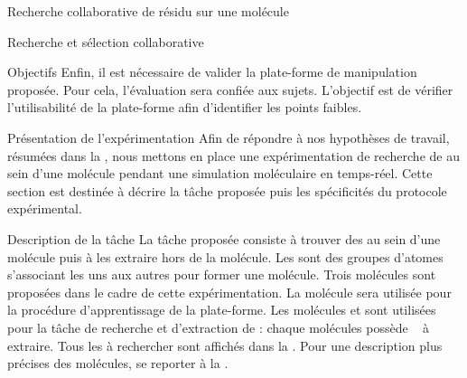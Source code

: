 \documentclass[myfrancais]{mythesis}
\begin{document}
\begin{mychapter}{Recherche collaborative de résidu sur une molécule}
\begin{mysection}{Recherche et sélection collaborative}
\begin{mysubsection}{Objectifs}
				Enfin, il est nécessaire de valider la plate-forme de manipulation proposée.
				Pour cela, l'évaluation sera confiée aux sujets.
				L'objectif est de vérifier l'utilisabilité de la plate-forme afin d'identifier les points faibles.
			\end{mysubsection}
		\end{mysection}
		\begin{mysection}{Présentation de l'expérimentation}
			Afin de répondre à nos hypothèses de travail, résumées dans la , nous mettons en place une expérimentation de recherche de  au sein d'une molécule pendant une simulation moléculaire en temps-réel.
			Cette section est destinée à décrire la tâche proposée puis les spécificités du protocole expérimental.
			\begin{mysubsection}{Description de la tâche}
				La tâche proposée consiste à trouver des  au sein d'une molécule puis à les extraire hors de la molécule.
				Les  sont des groupes d'atomes s'associant les uns aux autres pour former une molécule.
				Trois molécules sont proposées dans le cadre de cette expérimentation.
				La molécule \myTRPZIPPER sera utilisée pour la procédure d'apprentissage de la plate-forme.
				Les molécules \myTRPCAGE et \myPrion sont utilisées pour la tâche de recherche et d'extraction de  : chaque molécules possède ~ à extraire.
				Tous les  à rechercher sont affichés dans la .
				Pour une description plus précises des molécules, se reporter à la .


\end{mysubsection}
\end{mysection}
\end{mychapter}
\end{document}
